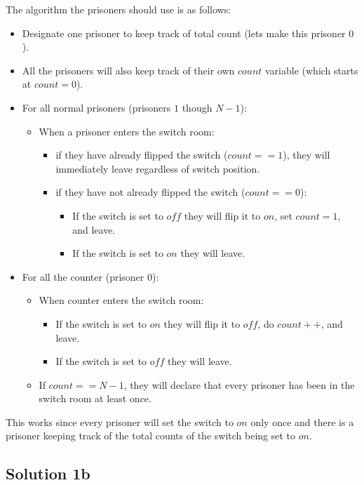 \documentclass{article}
\begin{document}
The algorithm the prisoners should use is as follows:
\begin{itemize}[label={}]
\item Designate one prisoner to keep track of total count (lets make this prisoner $0$).
\item All the prisoners will also keep track of their own $count$ variable (which starts at $count=0$).

\item For all normal prisoners (prisoners $1$ though $N-1$):
	\begin{itemize}[label={}]
	\item When a prisoner enters the switch room:
		\begin{itemize}[label={}]
		\item if they have already flipped the switch ($count == 1$), they will immediately leave regardless of switch position.
		\item if they have not already flipped the switch ($count == 0$):
			\begin{itemize} [label={}]
			\item If the switch is set to $off$ they will flip it to $on$, set $count = 1$, and leave.
			\item If the switch is set to $on$ they will leave.
			\end{itemize}
		\end{itemize}
	\end{itemize}
\item For all the counter (prisoner $0$):
	\begin{itemize}[label={}]
	\item When counter enters the switch room:
		\begin{itemize}[label={}]
		\item If the switch is set to $on$ they will flip it to $off$, do $count++$, and leave.
		\item If the switch is set to $off$ they will leave.
		\end{itemize}
	\item If $count == N-1$, they will declare that every prisoner has been in the switch room at least once.
	\end{itemize}
\end{itemize}
This works since every prisoner will set the switch to $on$ only once and there is a prisoner keeping track of the total counts of the switch being set to $on$. 

\subsection{Solution 1b}
\end{document}
